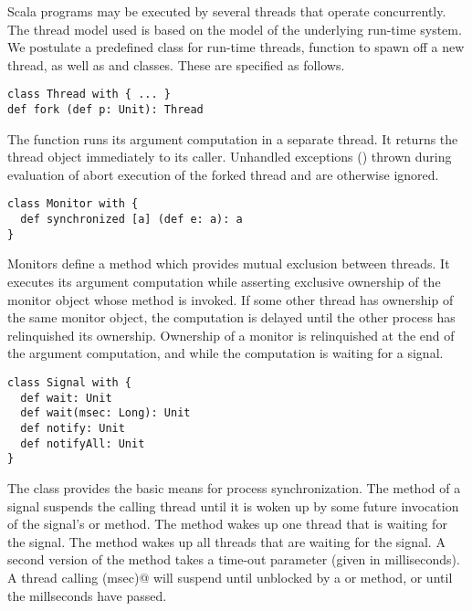 \documentclass[11pt]{report}
\begin{document}
Scala programs may be executed by several threads that operate
concurrently.  The thread model used is based on the model of the
underlying run-time system. We postulate a predefined
class \verb@Thread@ for run-time threads,
\verb@fork@ function to spawn off a new thread,
as well as \verb@Monitor@ and \verb@Signal@ classes. These are
specified as follows.


\begin{verbatim}
class Thread with { ... }
def fork (def p: Unit): Thread
\end{verbatim}

The \verb@fork@ function runs its argument computation \verb@p@ in a
separate thread.  It returns the thread object immediately to its
caller.  Unhandled exceptions () thrown during
evaluation of \verb@p@ abort execution of the forked thread and are
otherwise ignored.

\begin{verbatim}
class Monitor with {
  def synchronized [a] (def e: a): a
}
\end{verbatim}

Monitors define a \verb@synchronized@ method which provides mutual
exclusion between threads.  It executes its argument computation
\verb@e@ while asserting exclusive ownership of the monitor
object whose method is invoked. If some other thread has ownership of
the same monitor object, the computation is delayed until the other
process has relinquished its ownership. Ownership of a monitor is
relinquished at the end of the argument computation, and while the
computation is waiting for a signal.

\begin{verbatim}
class Signal with {
  def wait: Unit
  def wait(msec: Long): Unit
  def notify: Unit
  def notifyAll: Unit
}
\end{verbatim}

The \verb@Signal@ class provides the basic means for process
synchronization.  The \verb@wait@ method of a signal suspends the
calling thread until it is woken up by some future invocation of the
signal's \verb@notify@ or \verb@notifyAll@ method. The \verb@notify@
method wakes up one thread that is waiting for the signal. The
\verb@notifyAll@ method wakes up all threads that are waiting for the
signal. A second version of the \verb@wait@ method takes a time-out
parameter (given in milliseconds). A thread calling \verb@wait(msec)@
will suspend until unblocked by a \verb@notify@ or \verb@notifyAll@
method, or until the \verb@msec@ millseconds have passed.
\end{document}
